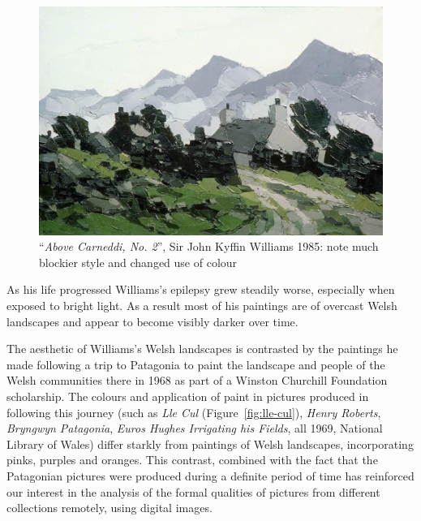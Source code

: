 \begin{figure}[h]
\includegraphics[width=\linewidth]{img/above_carneddi_no_2.jpeg}
\caption[``\emph{Above Carneddi, No. 2}'']{``\emph{Above Carneddi, No. 2}'', Sir John Kyffin Williams 1985: note much
blockier style and changed use of colour}\label{late_example}
\end{figure}

As his life progressed Williams's epilepsy grew steadily worse, especially when exposed to 
bright light. As a result most of his paintings are of overcast Welsh landscapes and appear to 
become visibly darker over time\cite{Harris2011How}.


The aesthetic of Williams's Welsh landscapes is contrasted by the paintings he
made following a trip to Patagonia to paint the landscape and people of the
Welsh communities there in 1968 as part of a Winston Churchill Foundation
scholarship. The colours and application of paint in pictures produced in
following this journey (such as \emph{Lle Cul} (Figure~\ref{fig:lle-cul}), \emph{Henry Roberts},
\emph{Bryngwyn Patagonia}, \emph{Euros Hughes Irrigating his Fields}, all 1969,
National Library of Wales) differ starkly from paintings of Welsh landscapes,
incorporating pinks, purples and oranges. This contrast, combined with the fact
that the Patagonian pictures were produced during a definite period of time has
reinforced our interest in the analysis of the formal qualities of pictures
from different collections remotely, using digital images. 

